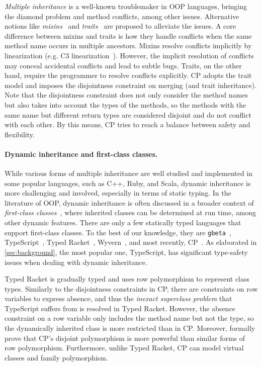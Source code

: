 \emph{Multiple inheritance} is a well-known troublemaker in OOP languages,
bringing the diamond problem and method conflicts, among other issues.
Alternative notions like \emph{mixins}~\citep{bracha1990mixin} and
\emph{traits}~\citep{ducasse2006traits} are proposed to alleviate the issues. A
core difference between mixins and traits is how they handle conflicts when the
same method name occurs in multiple ancestors. Mixins resolve conflicts
implicitly by linearization (e.g. C3
linearization~\citep{barrett1996monotonic}). However, the implicit resolution of
conflicts may conceal accidental conflicts and lead to subtle bugs. Traits, on
the other hand, require the programmer to resolve conflicts explicitly. CP
adopts the trait model and imposes the disjointness constraint on merging (and
trait inheritance). Note that the disjointness constraint does not only consider
the method names but also takes into account the types of the methods, so the
methods with the same name but different return types are considered disjoint
and do not conflict with each other. By this means, CP tries to reach a balance
between safety and flexibility.

\paragraph{Dynamic inheritance and first-class classes.} \label{sec:first-class}
While various forms of multiple inheritance are well studied and implemented in
some popular languages, such as C++, Ruby, and Scala, dynamic inheritance is
more challenging and involved, especially in terms of static typing. In the
literature of OOP, dynamic inheritance is often discussed in a broader context
of \emph{first-class classes}~\citep{strickland2013contracts}, where inherited
classes can be determined at run time, among other dynamic features. There are
only a few statically typed languages that support first-class classes. To the
best of our knowledge, they are \texttt{gbeta}~\citep{ernst2000gbeta},
TypeScript~\citep{typescript}, Typed Racket~\citep{takikawa2012gradual},
Wyvern~\citep{lee2015theory}, and most recently,
CP~\citep{zhang2021compositional}. As elaborated in \autoref{sec:background},
the most popular one, TypeScript, has significant type-safety issues when
dealing with dynamic inheritance.

Typed Racket is gradually typed and uses row polymorphism to represent class
types. Similarly to the disjointness constraints in CP, there are constraints on
row variables to express absence, and thus the \emph{inexact superclass problem}
that TypeScript suffers from is resolved in Typed Racket. However, the absence
constraint on a row variable only includes the method name but not the type, so
the dynamically inherited class is more restricted than in CP. Moreover,
\citet{xie2020row} formally prove that CP's disjoint polymorphism is more
powerful than similar forms of row polymorphism. Furthermore, unlike Typed
Racket, CP can model virtual classes and family polymorphism. 

